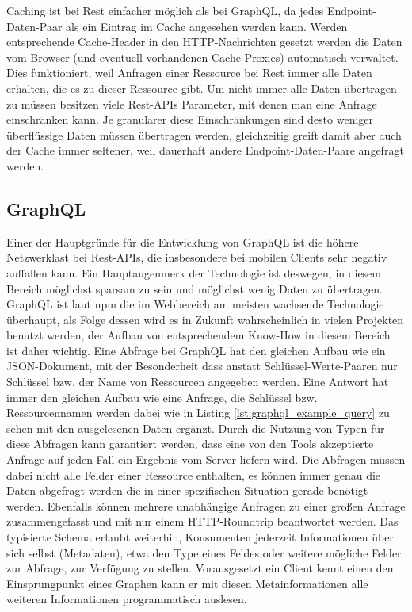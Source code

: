 Caching ist bei Rest einfacher möglich als bei GraphQL, da jedes Endpoint-Daten-Paar als ein Eintrag im Cache angesehen werden kann. Werden entsprechende Cache-Header in den HTTP-Nachrichten gesetzt werden die Daten vom Browser (und eventuell vorhandenen Cache-Proxies) automatisch verwaltet. Dies funktioniert, weil Anfragen einer Ressource bei Rest immer alle Daten erhalten, die es zu dieser Ressource gibt. Um nicht immer alle Daten übertragen zu müssen besitzen viele Rest-APIs Parameter, mit denen man eine Anfrage einschränken kann. Je granularer diese Einschränkungen sind desto weniger überflüssige Daten müssen übertragen werden, gleichzeitig greift damit aber auch der Cache immer seltener, weil dauerhaft andere Endpoint-Daten-Paare angefragt werden.

\subsection{GraphQL}
Einer der Hauptgründe für die Entwicklung von GraphQL ist die höhere Netzwerklast bei Rest-APIs, die insbesondere bei mobilen Clients sehr negativ auffallen kann. Ein Hauptaugenmerk der Technologie ist deswegen, in diesem Bereich möglichst sparsam zu sein und möglichst wenig Daten zu übertragen.
GraphQL ist laut npm  die im Webbereich am meisten wachsende Technologie überhaupt, als Folge dessen wird es in Zukunft wahrscheinlich in vielen Projekten benutzt werden, der Aufbau von entsprechendem Know-How in diesem Bereich ist daher wichtig.
Eine Abfrage bei GraphQL hat den gleichen Aufbau wie ein JSON-Dokument, mit der Besonderheit dass anstatt Schlüssel-Werte-Paaren nur Schlüssel bzw. der Name von Ressourcen angegeben werden. Eine Antwort hat immer den gleichen Aufbau wie eine Anfrage, die Schlüssel bzw. Ressourcennamen werden dabei wie in Listing \ref{lst:graphql_example_query} zu sehen mit den ausgelesenen Daten ergänzt. Durch die Nutzung von Typen für diese Abfragen kann garantiert werden, dass eine von den Tools akzeptierte Anfrage auf jeden Fall ein Ergebnis vom Server liefern wird. Die Abfragen müssen dabei nicht alle Felder einer Ressource enthalten, es können immer genau die Daten abgefragt werden die in einer spezifischen Situation gerade benötigt werden. Ebenfalls können mehrere unabhängige Anfragen zu einer großen Anfrage zusammengefasst und mit nur einem HTTP-Roundtrip beantwortet werden.
Das typisierte Schema erlaubt weiterhin, Konsumenten jederzeit Informationen über sich selbst (Metadaten), etwa den Type eines Feldes oder weitere mögliche Felder zur Abfrage, zur Verfügung zu stellen. Vorausgesetzt ein Client kennt einen den Einsprungpunkt eines Graphen kann er mit diesen Metainformationen alle weiteren Informationen programmatisch auslesen. 

